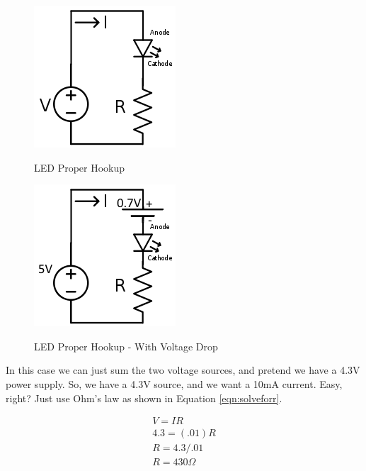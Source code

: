\begin{figure}[h]
\centering
\includegraphics[scale=0.75]{ledcircuit.png}
\label{fig:ledcircuit}
\caption{LED Proper Hookup}
\end{figure}

\begin{figure}[h]
\centering
\includegraphics[scale=0.75]{ledcircuitvoltagedrop.png}
\label{fig:ledcircuitvoltagedrop}
\caption{LED Proper Hookup - With Voltage Drop}
\end{figure}

In this case we can just sum the two voltage sources, and pretend we have a 4.3V power supply. So, we have a 4.3V source, and we want a 10mA current. Easy, right? Just use Ohm's law as shown in Equation \ref{eqn:solveforr}.

\begin{equation} \label{eqn:solveforr}
\begin{split}
V = IR \\
4.3 = (.01)R\\
R = 4.3/.01 \\
R = 430\Omega
\end{split}
\end{equation}

